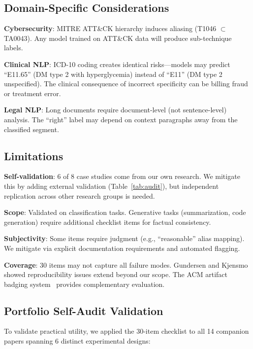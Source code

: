 \documentclass[review,3p]{elsarticle}
\begin{document}
\subsection{Domain-Specific Considerations}
\textbf{Cybersecurity}: MITRE ATT\&CK hierarchy induces aliasing (T1046 $\subset$ TA0043). Any model trained on ATT\&CK data will produce sub-technique labels.

\textbf{Clinical NLP}: ICD-10 coding creates identical risks---models may predict ``E11.65'' (DM type 2 with hyperglycemia) instead of ``E11'' (DM type 2 unspecified). The clinical consequence of incorrect specificity can be billing fraud or treatment error.

\textbf{Legal NLP}: Long documents require document-level (not sentence-level) analysis. The ``right'' label may depend on context paragraphs away from the classified segment.

\subsection{Limitations}
\textbf{Self-validation}: 6 of 8 case studies come from our own research. We mitigate this by adding external validation (Table~\ref{tab:audit}), but independent replication across other research groups is needed.

\textbf{Scope}: Validated on classification tasks. Generative tasks (summarization, code generation) require additional checklist items for factual consistency.

\textbf{Subjectivity}: Some items require judgment (e.g., ``reasonable'' alias mapping). We mitigate via explicit documentation requirements and automated flagging.

\textbf{Coverage}: 30 items may not capture all failure modes. Gundersen and Kjensmo~\cite{gundersen2018} showed reproducibility issues extend beyond our scope. The ACM artifact badging system~\cite{acm2020} provides complementary evaluation.

\subsection{Portfolio Self-Audit Validation}
To validate practical utility, we applied the 30-item checklist to all 14 companion papers spanning 6 distinct experimental designs:
\end{document}
